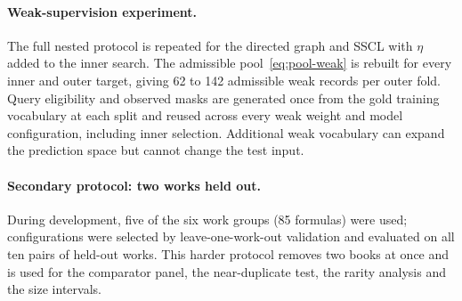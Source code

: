 \documentclass[applsci,article,submit,oneauthor]{Definitions/mdpi}
\begin{document}
\paragraph{Weak-supervision experiment.} The full nested protocol is repeated for the directed graph and SSCL with $\eta$ added to the inner search. The admissible pool~\eqref{eq:pool-weak} is rebuilt for every inner and outer target, giving 62 to 142 admissible weak records per outer fold. Query eligibility and observed masks are generated once from the gold training vocabulary at each split and reused across every weak weight and model configuration, including inner selection. Additional weak vocabulary can expand the prediction space but cannot change the test input.

\paragraph{Secondary protocol: two works held out.} During development, five of the six work groups (85 formulas) were used; configurations were selected by leave-one-work-out validation and evaluated on all ten pairs of held-out works. This harder protocol removes two books at once and is used for the comparator panel, the near-duplicate test, the rarity analysis and the size intervals.
\end{document}
